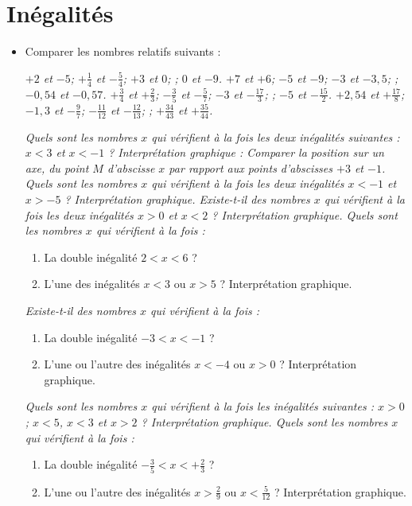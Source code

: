 \chapter{Inégalités}

\begin{itemize}
\item Comparer les nombres relatifs suivants : 
\begin{itemize}
\it $+2$ et $-5$; \phantom{miaou}
$+\frac14$ et $-\frac54$; \phantom{miaou}
$+3$ et $0$; ; \phantom{miaou}
$0$ et $-9$. 
\it $+7$ et $+6$; \phantom{miaou}
$-5$ et $-9$; \phantom{miaou}
$-3$ et $-3,5$; ; \phantom{miaou}
$-0,54$ et $-0,57$. 
\it $+\frac34$ et $+\frac23$; \phantom{miaou}
$-\frac35$ et $-\frac57$; \phantom{miaou}
$-3$ et $-\frac{17}3$; ; \phantom{miaou}
$-5$ et $-\frac{15}2$. 
\it $+2,54$ et $+\frac{17}8$; \phantom{miaou}
$-1,3$ et $-\frac97$; \phantom{miaou}
$-\frac{11}{12}$ et $-\frac{12}{13}$; ; \phantom{miaou}
$+\frac{34}{43}$ et $+\frac{35}{44}$. 
\end{itemize}
\it Quels sont les nombres $x$ qui vérifient à la fois les deux inégalités suivantes : $x<3$ et $x<-1$ ? Interprétation graphique : Comparer la position sur un axe, du point $M$ d'abscisse $x$ par rapport aux points d'abscisses $+3$ et $-1$.
\it Quels sont les nombres $x$ qui vérifient à la fois les deux inégalités $x<-1$ et $x > -5$ ? Interprétation graphique. 
\it Existe-t-il des nombres $x$ qui vérifient à la fois les deux inégalités $x>0$ et $x<2$ ? Interprétation graphique.
\it Quels sont les nombres $x$ qui vérifient à la fois :
\begin{enumerate}
\item La double inégalité $2<x<6$ ? 
\item L'une des inégalités $x<3$ ou $x>5$ ? Interprétation graphique.
\end{enumerate}
\it Existe-t-il des nombres $x$ qui vérifient à la fois : \begin{enumerate}
\item La double inégalité $-3<x<-1$ ?
\item L'une ou l'autre des inégalités $x<-4$ ou $x>0$ ? 
Interprétation graphique. 
\end{enumerate}
\it Quels sont les nombres $x$ qui vérifient à la fois les inégalités suivantes : $x>0$; $x<5$, $x<3$ et $x>2$ ? Interprétation graphique.
\it Quels sont les nombres $x$ qui vérifient à la fois : 
\begin{enumerate}
\item La double inégalité $-\frac35<x<+\frac23$ ?
\item L'une ou l'autre des inégalités $x>\frac29$ ou $x<\frac{5}{12}$ ? Interprétation graphique.
\end{enumerate}
\end{itemize}